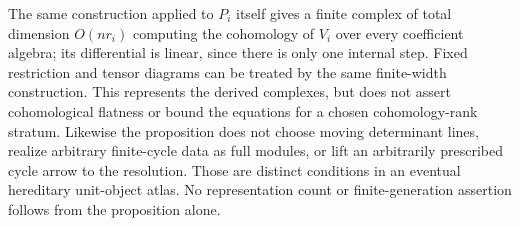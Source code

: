 \begin{remark}
The same construction applied to $P_i$ itself gives a finite
complex of total dimension $O(nr_i)$ computing the cohomology
of $V_i$ over every coefficient algebra; its differential
is linear, since there is only one internal step. Fixed
restriction and tensor diagrams can be treated by the same
finite-width construction. This represents the derived
complexes, but does not assert cohomological flatness or
bound the equations for a chosen cohomology-rank stratum.
Likewise the proposition does not choose moving determinant
lines, realize arbitrary finite-cycle data as full modules,
or lift an arbitrarily prescribed cycle arrow to the
resolution. Those are distinct conditions in an eventual
hereditary unit-object atlas. No representation count or
finite-generation assertion follows from the proposition
alone.
\end{remark}
